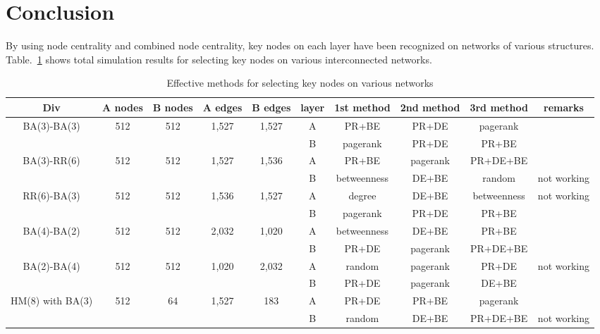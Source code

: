 \section{Conclusion}
By using node centrality and combined node centrality, key nodes on each layer have been recognized on networks of various structures. Table.~\ref{effective methods} shows total simulation results for selecting key nodes on various interconnected networks. 
\begin{table}[!htb]
	\scriptsize
	\centering
	\caption{Effective methods for selecting key nodes on various networks}
	\label{effective methods}
	\begin{center}
		\begin{tabular}{c|c|c|c|c|c|c|c|c|c} \hline\hline
		  Div                              & A nodes & B nodes & A edges & B edges & layer & 1st method & 2nd method  & 3rd method  & remarks    \\ \hline \hline
         \multirow{1}{*}{BA(3)-BA(3)}      & 512 	 & 512     & 1,527   & 1,527   & A     & PR+BE      & PR+DE       & pagerank    &            \\ 
			                               &  	     &         &         &         & B     & pagerank   & PR+DE       & PR+BE       &		     \\ \hline   
	     \multirow{1}{*}{BA(3)-RR(6)}      & 512     & 512     & 1,527   & 1,536   & A     & PR+BE      & pagerank    & PR+DE+BE    &            \\
	                                       &         &         &         &         & B     & betweenness& DE+BE       & random      & not working\\ \hline
	     \multirow{1}{*}{RR(6)-BA(3)}      & 512     & 512     & 1,536   & 1,527   & A     & degree     & DE+BE       & betweenness & not working\\ 
	                                       &         &         &         &         & B     & pagerank   & PR+DE       & PR+BE       &            \\ \hline
		 \multirow{1}{*}{BA(4)-BA(2)}      & 512     & 512     & 2,032   & 1,020   & A     & betweenness& DE+BE       & PR+BE       &            \\ 
		                                   &         &         &         &         & B     & PR+DE      & pagerank    & PR+DE+BE    &            \\ \hline
		 \multirow{1}{*}{BA(2)-BA(4)}      & 512     & 512     & 1,020   & 2,032   & A     & random     & pagerank    & PR+DE       & not working\\ 
		                                   &         &         &         &         & B     & PR+DE      & pagerank    & DE+BE       &            \\ \hline
		 \multirow{1}{*}{HM(8) with BA(3)} & 512     & 64      & 1,527   & 183     & A     & PR+DE      & PR+BE       & pagerank    &            \\ 
		                                   &         &         &         &         & B     & random     & DE+BE       & PR+DE+BE    & not working\\ \hline
			\hline
		\end{tabular}
	\end{center}
\end{table}
